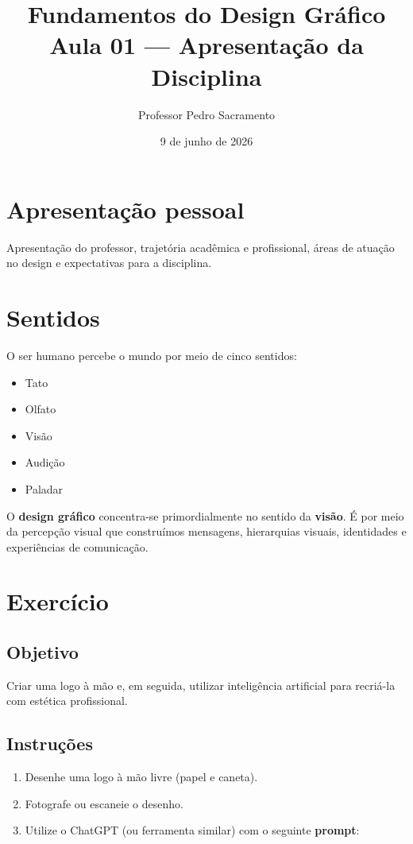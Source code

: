 \documentclass[a4paper,12pt]{article}
\title{\textbf{Fundamentos do Design Gráfico}\\[4pt]\large Aula 01 --- Apresentação da Disciplina}
\author{Professor Pedro Sacramento}
\date{9 de junho de 2026}
\begin{document}
\maketitle

\section{Apresentação pessoal}

Apresentação do professor, trajetória acadêmica e profissional, áreas de atuação no design e expectativas para a disciplina.

\section{Sentidos}

O ser humano percebe o mundo por meio de cinco sentidos:

\begin{itemize}[nosep]
  \item Tato
  \item Olfato
  \item Visão
  \item Audição
  \item Paladar
\end{itemize}

\bigskip
\noindent O \textbf{design gráfico} concentra-se primordialmente no sentido da \textbf{visão}. É por meio da percepção visual que construímos mensagens, hierarquias visuais, identidades e experiências de comunicação.

\section{Exercício}

\subsection*{Objetivo}
Criar uma logo à mão e, em seguida, utilizar inteligência artificial para recriá-la com estética profissional.

\subsection*{Instruções}
\begin{enumerate}[nosep]
  \item Desenhe uma logo à mão livre (papel e caneta).
  \item Fotografe ou escaneie o desenho.
  \item Utilize o ChatGPT (ou ferramenta similar) com o seguinte \textbf{prompt}:
\end{enumerate}
\end{document}
